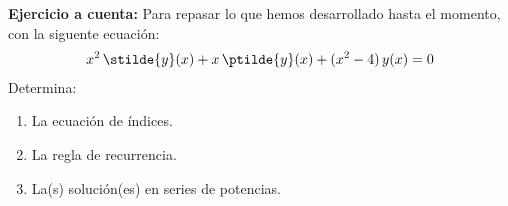 \textbf{Ejercicio a cuenta:}
Para repasar lo que hemos desarrollado hasta el momento, con la siguente ecuación:
\begin{align*}
x^{2} \, \stilde{y}(x) + x \, \ptilde{y}(x) + (x^{2} - 4) \, y(x) = 0
\end{align*}
Determina:
\begin{enumerate}
\item La ecuación de índices.
\item La regla de recurrencia.
\item La(s) solución(es) en series de potencias.
\end{enumerate}
